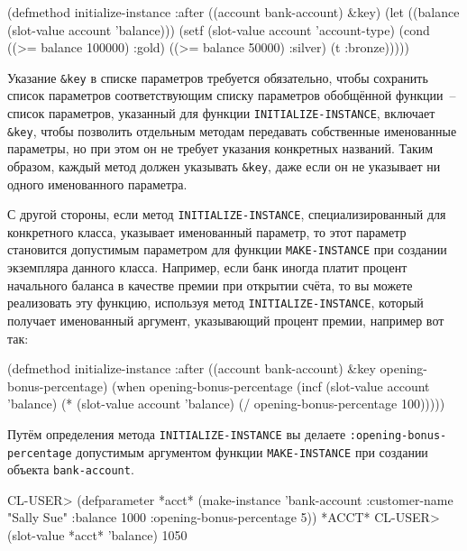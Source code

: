 \begin{myverb}
(defmethod initialize-instance :after ((account bank-account) &key)
  (let ((balance (slot-value account 'balance)))
    (setf (slot-value account 'account-type)
          (cond
            ((>= balance 100000) :gold)
            ((>= balance 50000) :silver)
            (t :bronze)))))
\end{myverb}

Указание \lstinline!&key! в списке параметров требуется обязательно, чтобы сохранить
список параметров соответствующим списку параметров обобщённой функции~-- список
параметров, указанный для функции \lstinline{INITIALIZE-INSTANCE}, включает \lstinline!&key!,
чтобы позволить отдельным методам передавать собственные именованные параметры, но при
этом он не требует указания конкретных названий.  Таким образом, каждый метод должен
указывать \lstinline!&key!, даже если он не указывает ни одного именованного параметра.

С другой стороны, если метод \lstinline{INITIALIZE-INSTANCE}, специализированный для
конкретного класса, указывает именованный параметр, то этот параметр становится допустимым
параметром для функции \lstinline{MAKE-INSTANCE} при создании экземпляра данного класса.
Например, если банк иногда платит процент начального баланса в качестве премии при
открытии счёта, то вы можете реализовать эту функцию, используя метод
\lstinline{INITIALIZE-INSTANCE}, который получает именованный аргумент, указывающий процент
премии, например вот так:

\begin{myverb}
(defmethod initialize-instance :after ((account bank-account)
                                       &key opening-bonus-percentage)
  (when opening-bonus-percentage
    (incf (slot-value account 'balance)
          (* (slot-value account 'balance) (/ opening-bonus-percentage 100)))))
\end{myverb}

Путём определения метода \lstinline{INITIALIZE-INSTANCE} вы делаете
\lstinline{:opening-bonus-percentage} допустимым аргументом функции \lstinline{MAKE-INSTANCE} при
создании объекта \lstinline{bank-account}.

\begin{myverb}
CL-USER> (defparameter *acct* (make-instance
                                'bank-account
                                 :customer-name "Sally Sue"
                                 :balance 1000
                                 :opening-bonus-percentage 5))
*ACCT*
CL-USER> (slot-value *acct* 'balance)
1050
\end{myverb}

